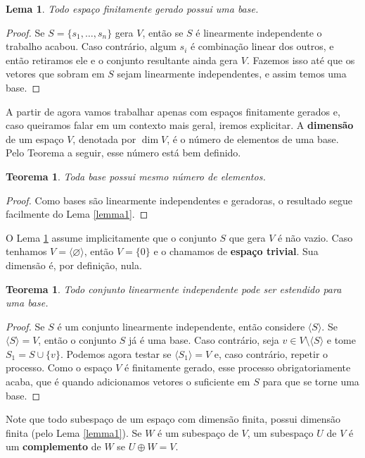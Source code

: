 \documentclass{article}
\newtheorem{lemma}[definition]{Lema}
\newtheorem{theorem}[definition]{Teorema}
\begin{document}
\begin{lemma}\label{lemma2}
    Todo espaço finitamente gerado possui uma base.
\end{lemma}
\begin{proof}
    Se $S = \{s_1, \dots, s_n\}$ gera $V$, então se $S$ é linearmente independente o trabalho acabou. Caso contrário, algum $s_i$ é combinação linear dos outros, e então retiramos ele e o conjunto resultante ainda gera $V$. Fazemos isso até que os vetores que sobram em $S$ sejam linearmente independentes, e assim temos uma base.
\end{proof}

A partir de agora vamos trabalhar apenas com espaços finitamente gerados e, caso queiramos falar em um contexto mais geral, iremos explicitar. A \textbf{dimensão} de um espaço $V$, denotada por $\dim V$, é o número de elementos de uma base. Pelo Teorema a seguir, esse número está bem definido.

\begin{theorem}
    Toda base possui mesmo número de elementos.
\end{theorem}
\begin{proof}
    Como bases são linearmente independentes e geradoras, o resultado segue facilmente do Lema \ref{lemma1}.
\end{proof}

O Lema \ref{lemma2} assume implicitamente que o conjunto $S$ que gera $V$ é não vazio. Caso tenhamos $V = \langle\varnothing\rangle$, então $V = \{0\}$ e o chamamos de \textbf{espaço trivial}. Sua dimensão é, por definição, nula.

\begin{theorem}
    Todo conjunto linearmente independente pode ser estendido para uma base.
\end{theorem}
\begin{proof}
    Se $S$ é um conjunto linearmente independente, então considere $\langle S \rangle$. Se $\langle S \rangle = V$, então o conjunto $S$ já é uma base. Caso contrário, seja $v \in V \setminus \langle S \rangle$ e tome $S_1 = S \cup \{v\}$. Podemos agora testar se $\langle S_1 \rangle = V$ e, caso contrário, repetir o processo. Como o espaço $V$ é finitamente gerado, esse processo obrigatoriamente acaba, que é quando adicionamos vetores o suficiente em $S$ para que se torne uma base.
\end{proof}

Note que todo subespaço de um espaço com dimensão finita, possui dimensão finita (pelo Lema \ref{lemma1}). Se $W$ é um subespaço de $V$, um subespaço $U$ de $V$ é um \textbf{complemento} de $W$ se $U \oplus W = V$.
\end{document}

